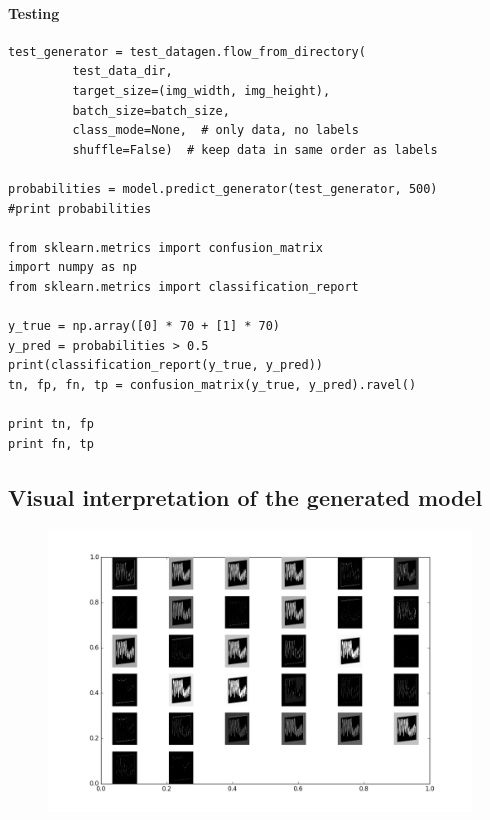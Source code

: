 \documentclass[a4paper,11pt]{article}
\begin{document}
\paragraph{Testing}
\begin{verbatim}
test_generator = test_datagen.flow_from_directory(
         test_data_dir,
         target_size=(img_width, img_height),
         batch_size=batch_size,
         class_mode=None,  # only data, no labels
         shuffle=False)  # keep data in same order as labels

probabilities = model.predict_generator(test_generator, 500)
#print probabilities

from sklearn.metrics import confusion_matrix
import numpy as np
from sklearn.metrics import classification_report

y_true = np.array([0] * 70 + [1] * 70)
y_pred = probabilities > 0.5
print(classification_report(y_true, y_pred))
tn, fp, fn, tp = confusion_matrix(y_true, y_pred).ravel()

print tn, fp
print fn, tp

\end{verbatim}

\subsection{Visual interpretation of the generated model}
\begin{figure}
\centering
\includegraphics[width=5.00in]{layer1_act.png}
\end{figure}
\end{document}
